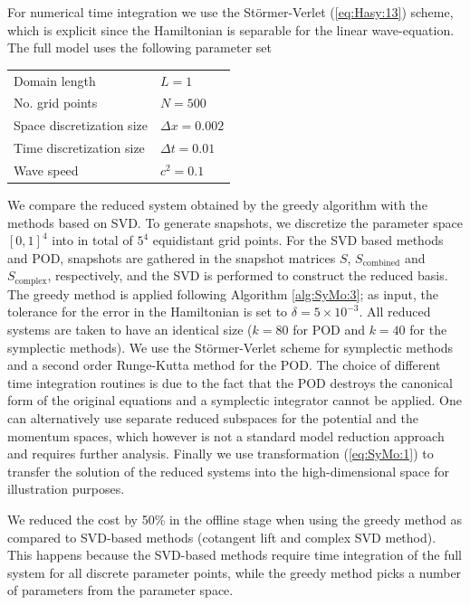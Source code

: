For numerical time integration we {\edit use} the St\"ormer-Verlet (\ref{eq:Hasy:13}) scheme, {\edit which is explicit since} the Hamiltonian is separable for the linear wave-equation. The full model uses the following parameter set \vspace{0.5cm}
\begin{center}
\begin{tabular}{|l|l|}
\hline
Domain length & $L = 1$ \\
No. grid points & $N = 500$ \\
Space discretization size & $\Delta x = 0.002$ \\
Time discretization size & $\Delta t = 0.01$ \\
Wave speed & $c^2 = 0.1$ \\
\hline
\end{tabular}
\end{center}
\vspace{0.5cm}
We compare the reduced system obtained by the greedy algorithm with the methods based on SVD. To generate snapshots, we discretize the parameter space $[0,1]^4$ into in total of $5^4$ equidistant grid points. For the SVD based methods and POD, snapshots are gathered in the snapshot matrices $S$, $S_{\text{combined}}$ and $S_{\text{complex}}$, respectively, and the SVD is performed to construct the reduced basis. The greedy method is applied following Algorithm \ref{alg:SyMo:3}; as input, the tolerance for the error in the Hamiltonian is set to $\delta = 5 \times 10^{-3}$. All reduced systems are taken to have an identical size ($k=80$ for POD and $k=40$ for the symplectic methods). We use the {\edit St\"ormer-Verlet} scheme for symplectic methods and a second order Runge-Kutta method for the POD. {\edit The choice of different time integration routines is due to the fact that the POD destroys the canonical form of the original equations and a symplectic integrator cannot be applied. One can alternatively use separate reduced subspaces for the potential and the momentum spaces, which however is not a standard model reduction approach and requires further analysis.} Finally we use transformation (\ref{eq:SyMo:1}) to transfer the solution of the reduced systems into the high-dimensional space for illustration purposes.



We reduced the cost by 50\% in the offline stage when using the greedy method as compared to SVD-based methods (cotangent lift and complex SVD method). This happens because the SVD-based methods require time integration of the full system for all discrete parameter points, while the greedy method picks a number of parameters from the parameter space. 



